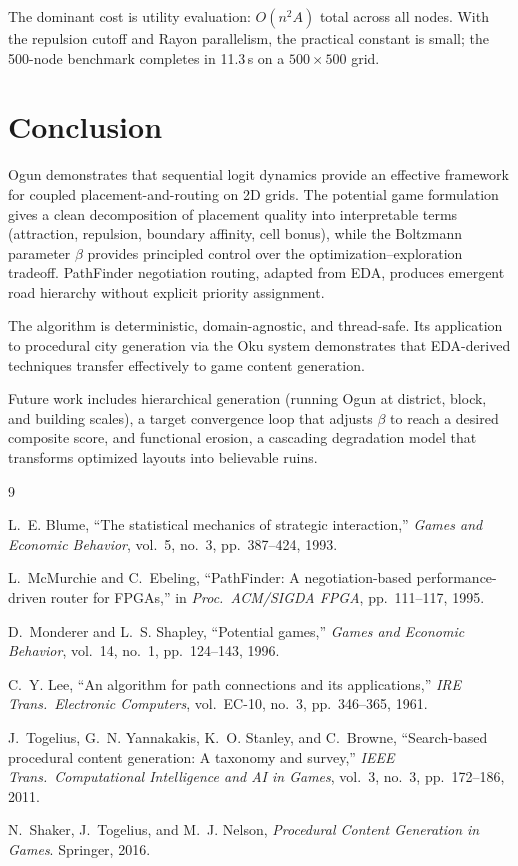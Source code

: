\documentclass[11pt,a4paper]{article}
\begin{document}
The dominant cost is utility evaluation: $O(n^2 A)$ total across all nodes.
With the repulsion cutoff and Rayon parallelism, the practical constant is
small; the 500-node benchmark completes in 11.3\,s on a $500 \times 500$ grid.

\section{Conclusion}

Ogun demonstrates that sequential logit dynamics provide an effective framework
for coupled placement-and-routing on 2D grids. The potential game formulation
gives a clean decomposition of placement quality into interpretable terms
(attraction, repulsion, boundary affinity, cell bonus), while the Boltzmann
parameter $\beta$ provides principled control over the optimization--exploration
tradeoff. PathFinder negotiation routing, adapted from EDA, produces emergent
road hierarchy without explicit priority assignment.

The algorithm is deterministic, domain-agnostic, and thread-safe. Its
application to procedural city generation via the Oku system demonstrates that
EDA-derived techniques transfer effectively to game content generation.

Future work includes hierarchical generation (running Ogun at district, block,
and building scales), a target convergence loop that adjusts $\beta$ to reach a
desired composite score, and functional erosion, a cascading degradation model that
transforms optimized layouts into believable ruins.

\begin{thebibliography}{9}

L.~E. Blume, ``The statistical mechanics of strategic interaction,''
\emph{Games and Economic Behavior}, vol.~5, no.~3, pp.~387--424, 1993.

L.~McMurchie and C.~Ebeling, ``PathFinder: A negotiation-based
performance-driven router for FPGAs,'' in \emph{Proc.\ ACM/SIGDA FPGA},
pp.~111--117, 1995.

D.~Monderer and L.~S. Shapley, ``Potential games,'' \emph{Games and Economic
Behavior}, vol.~14, no.~1, pp.~124--143, 1996.

C.~Y. Lee, ``An algorithm for path connections and its applications,''
\emph{IRE Trans.\ Electronic Computers}, vol.~EC-10, no.~3, pp.~346--365,
1961.

J.~Togelius, G.~N. Yannakakis, K.~O. Stanley, and C.~Browne, ``Search-based
procedural content generation: A taxonomy and survey,'' \emph{IEEE Trans.\
Computational Intelligence and AI in Games}, vol.~3, no.~3, pp.~172--186, 2011.

N.~Shaker, J.~Togelius, and M.~J. Nelson, \emph{Procedural Content Generation
in Games}. Springer, 2016.

\end{thebibliography}
\end{document}
